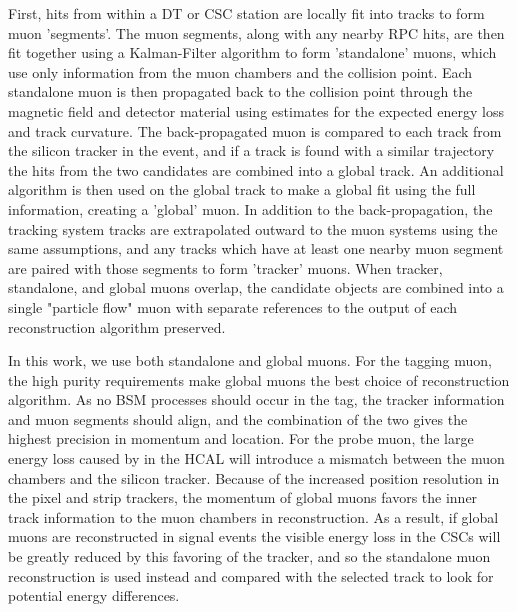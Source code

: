First, hits from within a DT or CSC station are locally fit into tracks to form muon 'segments'.
The muon segments, along with any nearby RPC hits, are then fit together using a Kalman-Filter algorithm to form 'standalone' muons, which use only information from the muon chambers and the collision point.
Each standalone muon is then propagated back to the collision point through the magnetic field and detector material using estimates for the expected energy loss and track curvature.
The back-propagated muon is compared to each track from the silicon tracker in the event, and if a track is found with a similar trajectory the hits from the two candidates are combined into a global track.
An additional \kf algorithm is then used on the global track to make a global fit using the full information, creating a 'global' muon. 
In addition to the back-propagation, the tracking system tracks are extrapolated outward to the muon systems using the same assumptions, and any tracks which have at least one nearby muon segment are paired with those segments to form 'tracker' muons. 
When tracker, standalone, and global muons overlap, the candidate objects are combined into a single "particle flow" muon with separate references to the output of each reconstruction algorithm preserved.

In this work, we use both standalone and global muons. 
For the tagging muon, the high purity requirements make global muons the best choice of reconstruction algorithm. 
As no BSM processes should occur in the tag, the tracker information and muon segments should align, and the combination of the two gives the highest precision in momentum and location. 
For the probe muon, the large energy loss caused by \dbrem in the HCAL will introduce a mismatch between the muon chambers and the silicon tracker. 
Because of the increased position resolution in the pixel and strip trackers, the momentum of global muons favors the inner track information to the muon chambers in reconstruction.
As a result, if global muons are reconstructed in signal events the visible energy loss in the CSCs will be greatly reduced by this favoring of the tracker, and so the standalone muon reconstruction is used instead and compared with the selected track to look for potential energy differences.
